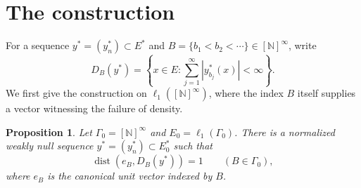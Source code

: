 \documentclass[11pt,a4paper]{amsart}
\newtheorem{proposition}[theorem]{Proposition}
\theoremstyle{remark}
\newcommand{\N}{\mathbb N}
\DeclareMathOperator{\dist}{dist}
\begin{document}
\section{The construction}

For a sequence $y^*=(y_n^*)\subset E^*$ and
$B=\{b_1<b_2<\cdots\}\in[\N]^\infty$, write
\[
 D_B(y^*)=\left\{x\in E:\sum_{j=1}^{\infty}|y_{b_j}^*(x)|<\infty\right\}.
\]
We first give the construction on $\ell_1([\N]^\infty)$, where
the index $B$ itself supplies a vector witnessing the failure of density.

\begin{proposition}\label{prop:construction}
Let $\Gamma_0=[\N]^\infty$ and $E_0=\ell_1(\Gamma_0)$. There is a
normalized weakly null sequence $y^*=(y_n^*)\subset E_0^*$ such that
\[
 \dist(e_B,D_B(y^*))=1\qquad(B\in\Gamma_0),
\]
where $e_B$ is the canonical unit vector indexed by $B$.
\end{proposition}
\end{document}
